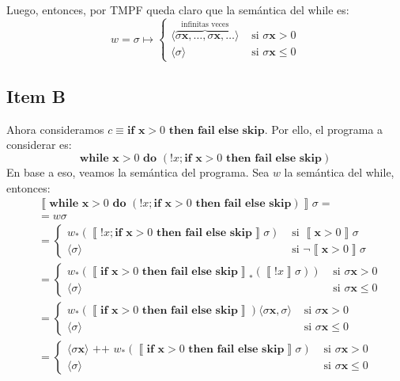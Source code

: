\documentclass{article}
\newcommand{\sem}[1]{\left\llbracket #1\right\rrbracket}
\newcommand{\x}{\textbf{x}}
\newcommand{\concat}{\texttt{ ++ }}
\newcommand{\cskip}{\textbf{skip}}
\newcommand{\cif}[3]{\textbf{if }#1\textbf{ then }#2\textbf{ else }#3}
\newcommand{\cwhile}[2]{\textbf{while }#1\textbf{ do }#2}
\newcommand{\cfail}{\textbf{fail}}
\newcommand{\cout}[1]{\langle #1\rangle}
\begin{document}
Luego, entonces, por TMPF queda claro que la semántica del while es:
\begin{equation*}
  w = \sigma \mapsto \begin{cases}
    \cout{\overbrace{\sigma\x, \dots, \sigma\x, \dots}^\text{infinitas veces}} &\text{ si }\sigma\x > 0 \\ 
    \cout{\sigma} &\text{ si }\sigma\x \leq 0
  \end{cases}
\end{equation*}

\subsection*{Item B}
Ahora consideramos $c \equiv \cif{\x>0}{\cfail}{\cskip}$.
Por ello, el programa a considerar es:
\begin{equation*}
  \cwhile{\x>0}{(!x; \cif{\x>0}{\cfail}{\cskip})}
\end{equation*}
En base a eso, veamos la semántica del programa.
Sea $w$ la semántica del while, entonces:
\begin{equation*}
  \begin{aligned}
    &\sem{\cwhile{\x>0}{(!x; \cif{\x>0}{\cfail}{\cskip})}} \sigma = \\
    &= w\sigma \\ 
    &= \begin{cases}
      w_* (\sem{!x; \cif{\x>0}{\cfail}{\cskip}}\sigma) &\text{ si }\sem{\x>0}\sigma \\ 
      \cout{\sigma} &\text{ si }\neg\sem{\x>0}\sigma
    \end{cases} \\ 
    &= \begin{cases}
      w_* (\sem{\cif{\x>0}{\cfail}{\cskip}}_* (\sem{!x}\sigma)) &\text{ si }\sigma\x > 0 \\ 
      \cout{\sigma} &\text{ si }\sigma\x \leq 0 
    \end{cases} \\ 
    &= \begin{cases}
      w_* (\sem{\cif{\x>0}{\cfail}{\cskip}}) \cout{\sigma\x, \sigma} &\text{ si }\sigma\x > 0 \\ 
      \cout{\sigma} &\text{ si }\sigma\x \leq 0 
    \end{cases} \\ 
    &= \begin{cases}
      \cout{\sigma\x} \concat w_* (\sem{\cif{\x>0}{\cfail}{\cskip}} \sigma) &\text{ si }\sigma\x > 0 \\ 
      \cout{\sigma} &\text{ si }\sigma\x \leq 0
    \end{cases} 
  \end{aligned}
\end{equation*}
\end{document}
